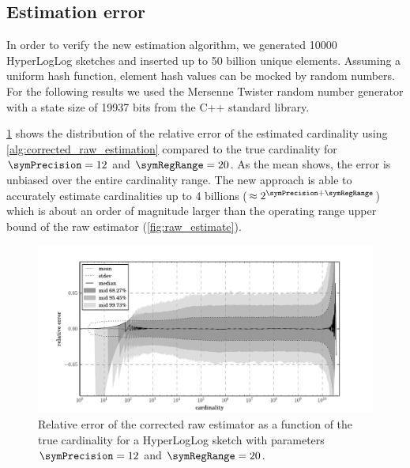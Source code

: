 \documentclass[a4paper]{scrartcl}
\begin{document}
\subsection{Estimation error}
\label{sec:corrected_raw_estimation_error}
In order to verify the new estimation algorithm, we generated \num{10000} HyperLogLog sketches and inserted up to 50 billion unique elements. Assuming a uniform hash function, element hash values can be mocked by random numbers. For the following results we used the Mersenne Twister random number generator with a state size of \num{19937} bits from the C++ standard library.

\cref{fig:raw_corrected_estimation_error_12_20} shows the distribution of the relative error of the estimated cardinality using \cref{alg:corrected_raw_estimation} compared to the true cardinality for $\symPrecision=12$ and $\symRegRange=20$. As the mean shows, the error is unbiased over the entire cardinality range. The new approach is able to accurately estimate cardinalities up to 4 billions ($\approx 2^{\symPrecision+\symRegRange}$) which is about an order of magnitude larger than the operating range upper bound of the raw estimator (\cref{fig:raw_estimate}).

\begin{figure}
\centering
\includegraphics[width=1\textwidth]{raw_corrected_estimate_12_20}
\caption{Relative error of the corrected raw estimator as a function of the true cardinality for a HyperLogLog sketch with parameters $\symPrecision = 12$ and $\symRegRange=20$.}
\label{fig:raw_corrected_estimation_error_12_20}
\end{figure}
\end{document}
